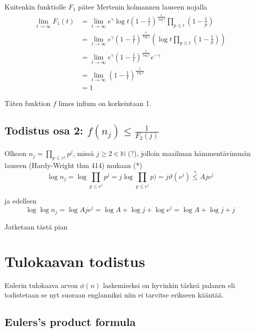 \documentclass{article}
\theoremstyle{definition}
\begin{document}
Kuitenkin funktiolle $F_1$ pätee Mertenin kolmannen lauseen nojalla
\begin{align*}
    \lim_{t \rightarrow \infty} F_1(t) & = \lim_{t \rightarrow \infty} e^\gamma \log t \left(1-\frac{1}{t}\right)^\frac{t}{\log t} \prod_{p\leq t} \left(1-\frac{1}{p}\right)\\
    & = \lim_{t \rightarrow \infty} e^\gamma \left( 1-\frac{1}{t}\right)^\frac{t}{\log t} \left(\log t \prod_{p\leq t} \left(1-\frac{1}{p}\right) \right)\\
    & = \lim_{t \rightarrow \infty} e^\gamma \left( 1-\frac{1}{t}\right)^\frac{t}{\log t} e^{-\gamma}\\
    & = \lim_{t \rightarrow \infty} \left( 1-\frac{1}{t}\right)^\frac{t}{\log t}\\
    & = 1
\end{align*}

Täten funktion $f$ limes infium on korkeintaan 1.

\subsection{Todistus osa 2: $f(n_j) \leq \frac{1}{F_2(j)}$}


Olkoon $n_j=\prod_{p\leq e^j} p^j$, missä $j\geq 2 \in \mathbb{N}$ (?), jolloin maailman hämmentävimmän lauseen (Hardy-Wright thm 414) mukaan (*)
\begin{equation}
    \log n_j = \log \prod_{p\leq e^j} p^j = j \log \prod_{p\leq e^j} p) = j\vartheta(e^j) \stackrel{*}{\leq} Aje^j
\end{equation}

ja edelleen
\begin{equation}
    \log \log n_j = \log Aje^j = \log A + \log j + \log e^j = \log A + \log j + j
\end{equation}

Jatketaan tästä pian

\section{Tulokaavan todistus}

Eulerin tulokaava arvon $\phi(n)$ laskemiseksi on hyvinkin tärkeä palanen eli todistetaan se nyt suoraan englanniksi niin ei tarvitse erikseen kääntää.

\subsection{Eulers's product formula}
\end{document}
